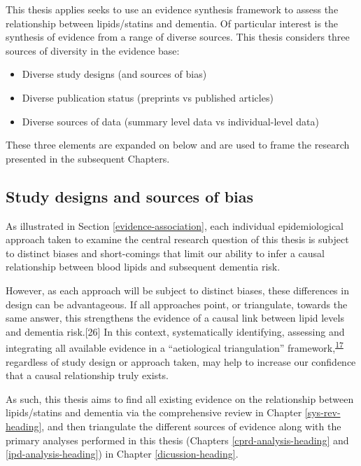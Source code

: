 \documentclass[a4paper, twoside]{templates/ociamthesis}
\providecommand{\tightlist}{%
  \setlength{\itemsep}{0pt}\setlength{\parskip}{0pt}}
\begin{document}
This thesis applies seeks to use an evidence synthesis framework to assess the relationship between lipids/statins and dementia. Of particular interest is the synthesis of evidence from a range of diverse sources. This thesis considers three sources of diversity in the evidence base:

\begin{itemize}
\tightlist
\item
  Diverse study designs (and sources of bias)
\item
  Diverse publication status (preprints vs published articles)
\item
  Diverse sources of data (summary level data vs individual-level data)
\end{itemize}

These three elements are expanded on below and are used to frame the research presented in the subsequent Chapters.

\hypertarget{study-designs-and-sources-of-bias}{%
\subsection{Study designs and sources of bias}\label{study-designs-and-sources-of-bias}}

As illustrated in Section \ref{evidence-association}, each individual epidemiological approach taken to examine the central research question of this thesis is subject to distinct biases and short-comings that limit our ability to infer a causal relationship between blood lipids and subsequent dementia risk.

However, as each approach will be subject to distinct biases, these differences in design can be advantageous. If all approaches point, or triangulate, towards the same answer, this strengthens the evidence of a causal link between lipid levels and dementia risk.{[}26{]} In this context, systematically identifying, assessing and integrating all available evidence in a ``aetiological triangulation'' framework,\textsuperscript{\protect\hyperlink{ref-lawlor2016a}{17}} regardless of study design or approach taken, may help to increase our confidence that a causal relationship truly exists.

As such, this thesis aims to find all existing evidence on the relationship between lipids/statins and dementia via the comprehensive review in Chapter \ref{sys-rev-heading}, and then triangulate the different sources of evidence along with the primary analyses performed in this thesis (Chapters \ref{cprd-analysis-heading} and \ref{ipd-analysis-heading}) in Chapter \ref{dicussion-heading}.
\end{document}
